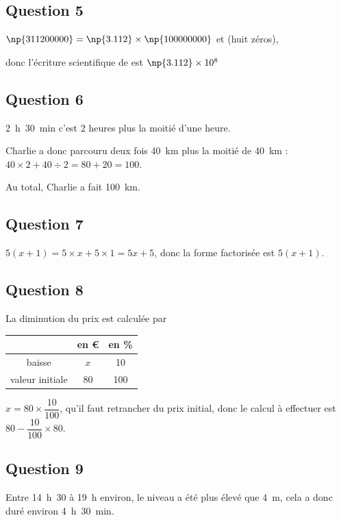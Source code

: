 \subsection*{Question 5}
	{$\np{311200000}=\np{3.112}\times\np{100000000}$} \quad et  (huit zéros),

	donc l'écriture scientifique de  est {$\np{3.112}\times10^8$}

\subsection*{Question 6}
	2~h~30~min c'est 2 heures plus la moitié d'une heure.

	Charlie a donc parcouru deux fois 40~km plus la moitié de 40~km :
	\quad $40 \times 2 + 40 \div 2 = 80 + 20 = 100$.

	Au total, {Charlie a fait 100~km.}

\subsection*{Question 7}
	{$5(x+1)=5\times x + 5\times 1 = 5x+5$}, donc la forme factorisée est {{$5(x+1)$}.}

\subsection*{Question 8}
	La diminution du prix est calculée par \quad
	\begin{tabular}{c|c|c}
		                & en \euro{} & en \% \\ \hline
		    baisse      &    $x$     &  10   \\ \hline
		valeur initiale &     80     &  100
	\end{tabular}

	{$x=80\times\dfrac{10}{100}$}, qu'il faut retrancher du prix initial, donc le calcul à effectuer est {	{$80-\dfrac{10}{100}\times80$}.}

\subsection*{Question 9}

	Entre 14~h~30 à 19~h environ, le niveau a été plus élevé que 4~m, cela a donc duré {environ 4~h~30~min.}

